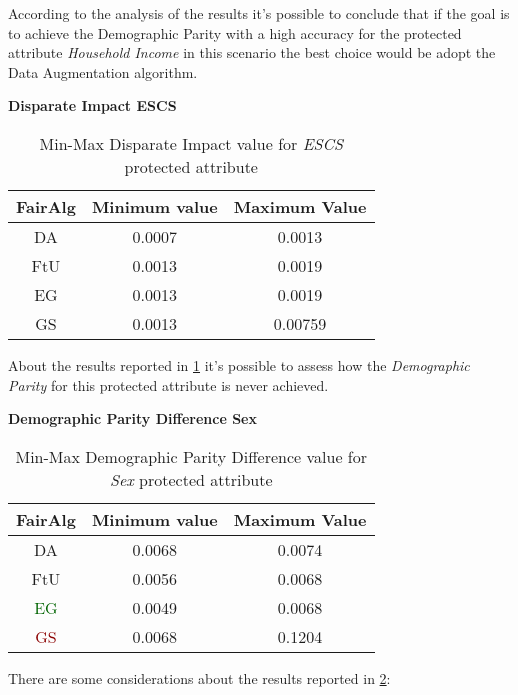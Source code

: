 According to the analysis of the results it's possible to conclude that if the goal is to achieve the Demographic Parity with a high accuracy for the protected attribute \emph{Household Income} in this scenario the best choice would be adopt the Data Augmentation algorithm.

\textbf{Disparate Impact ESCS}
\begin{table}
    \centering
    \begin{tabular}{|c|c|c|}
        \hline
        \textbf{FairAlg} & \textbf{Minimum value} & \textbf{Maximum Value} \\
        \hline
        DA & 0.0007 & 0.0013 \\
        \hline
        FtU & 0.0013 & 0.0019 \\
        \hline
        EG & 0.0013 & 0.0019 \\
        \hline
        GS & 0.0013 & 0.00759 \\
        \hline
    \end{tabular}
    \caption{Min-Max Disparate Impact value for \emph{ESCS} protected attribute}
    \label{tab:e_di}
\end{table}

About the results reported in \cref{tab:e_di} it's possible to assess how the \emph{Demographic Parity} for this protected attribute is never achieved.


\textbf{Demographic Parity Difference Sex}
\begin{table}[H]
    \centering
    \begin{tabular}{|c|c|c|}
        \hline
        \textbf{FairAlg} & \textbf{Minimum value} & \textbf{Maximum Value} \\
        \hline
        DA & 0.0068 & 0.0074 \\
        \hline
        FtU & 0.0056 & 0.0068 \\
        \hline
        \textcolor{darkgreen}{EG} & 0.0049 & 0.0068 \\
        \hline
        \textcolor{darkred}{GS} & 0.0068 & 0.1204 \\
        \hline
    \end{tabular}
    \caption{Min-Max Demographic Parity Difference value for \emph{Sex} protected attribute}
    \label{tab:s_dpd}
\end{table}

There are some considerations about the results reported in \cref{tab:s_dpd}:

